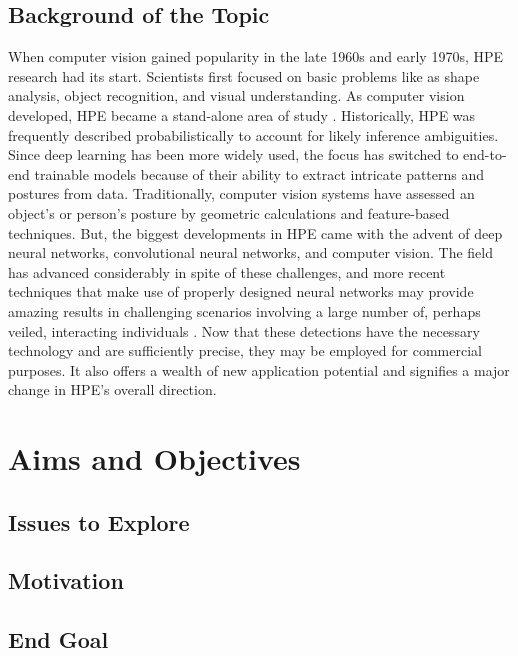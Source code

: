 \documentclass[runningheads]{llncs}
\begin{document}
    \subsection{Background of the Topic}
        When computer vision gained popularity in the late 1960s and early 1970s, HPE research had its start. Scientists first focused on basic problems like as shape analysis, object recognition, and visual understanding. As computer vision developed, HPE became a stand-alone area of study \parencite{Roboflow}. Historically, HPE was frequently described probabilistically to account for likely inference ambiguities. Since deep learning has been more widely used, the focus has switched to end-to-end trainable models because of their ability to extract intricate patterns and postures from data. Traditionally, computer vision systems have assessed an object's or person's posture by geometric calculations and feature-based techniques. But, the biggest developments in HPE came with the advent of deep neural networks, convolutional neural networks, and computer vision. The field has advanced considerably in spite of these challenges, and more recent techniques that make use of properly designed neural networks may provide amazing results in challenging scenarios involving a large number of, perhaps veiled, interacting individuals \parencite{liu2018recognizing}. Now that these detections have the necessary technology and are sufficiently precise, they may be employed for commercial purposes. It also offers a wealth of new application potential and signifies a major change in HPE's overall direction.



\section{Aims and Objectives} %
    \subsection{Issues to Explore}

    \subsection{Motivation}

    \subsection{End Goal}
\end{document}
